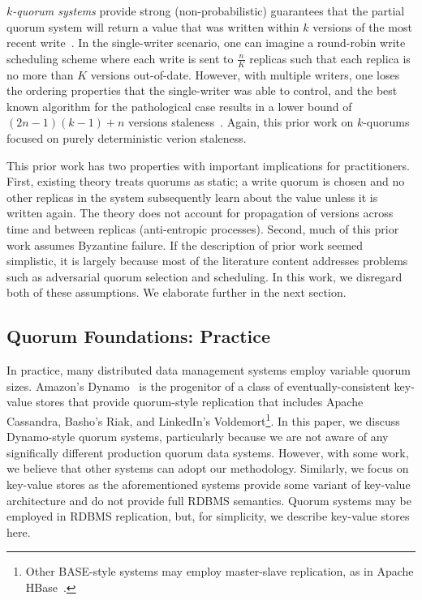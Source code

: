 \documentclass{vldb}
\begin{document}
\textit{$k$-quorum systems} provide strong (non-probabilistic)
guarantees that the partial quorum system will return a value that was
written within $k$ versions of the most recent
write~\cite{nonstrict-availability}.  In the single-writer scenario,
one can imagine a round-robin write scheduling scheme where each write
is sent to $\frac{n}{K}$ replicas such that each replica is no more
than $K$ versions out-of-date.  However, with multiple writers, one
loses the ordering properties that the single-writer was able to
control, and the best known algorithm for the pathological case
results in a lower bound of $(2n-1)(k-1)+n$ versions staleness~\cite{k-quorum-lb}.
Again, this prior work on $k$-quorums focused on purely deterministic
verion staleness.

This prior work has two properties with important implications for
practitioners.  First, existing theory treats quorums as static; a
write quorum is chosen and no other replicas in the system
subsequently learn about the value unless it is written again.  The
theory does not account for propagation of versions across time and
between replicas (anti-entropic processes).  Second, much of this
prior work assumes Byzantine failure.  If the description of prior
work seemed simplistic, it is largely because most of the literature
content addresses problems such as adversarial quorum selection and
scheduling.  In this work, we disregard both of these assumptions.  We
elaborate further in the next section.

\subsection{Quorum Foundations: Practice}
\label{sec:practice}

In practice, many distributed data management systems employ variable
quorum sizes. Amazon's Dynamo~\cite{dynamo} is the progenitor of a
class of eventually-consistent key-value stores that provide
quorum-style replication that includes Apache Cassandra, Basho's Riak,
and LinkedIn's Voldemort\footnote{Other BASE-style systems may employ
  master-slave replication, as in Apache HBase~\cite{hbase}.}.  In
this paper, we discuss Dynamo-style quorum systems, particularly
because we are not aware of any significally different production
quorum data systems.  However, with some work, we believe that other
systems can adopt our methodology.  Similarly, we focus on key-value
stores as the aforementioned systems provide some variant of key-value
architecture and do not provide full RDBMS semantics.  Quorum systems
may be employed in RDBMS replication, but, for simplicity, we describe
key-value stores here.
\end{document}
